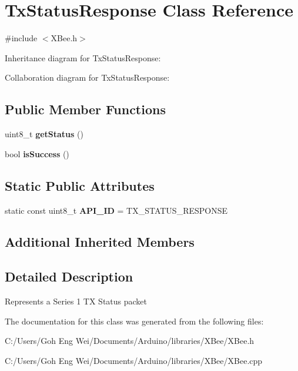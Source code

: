 \hypertarget{class_tx_status_response}{}\section{Tx\+Status\+Response Class Reference}
\label{class_tx_status_response}


{\ttfamily \#include $<$X\+Bee.\+h$>$}



Inheritance diagram for Tx\+Status\+Response\+:


Collaboration diagram for Tx\+Status\+Response\+:
\subsection*{Public Member Functions}
\begin{DoxyCompactItemize}
\item 
\hypertarget{class_tx_status_response_ac6670f7b35b65d9d032c8c4689617569}{}\label{class_tx_status_response_ac6670f7b35b65d9d032c8c4689617569} 
uint8\+\_\+t {\bfseries get\+Status} ()
\item 
\hypertarget{class_tx_status_response_ab5a35099727e48e2a3db12d844881607}{}\label{class_tx_status_response_ab5a35099727e48e2a3db12d844881607} 
bool {\bfseries is\+Success} ()
\end{DoxyCompactItemize}
\subsection*{Static Public Attributes}
\begin{DoxyCompactItemize}
\item 
\hypertarget{class_tx_status_response_a4834d215c5ff641bd2564b6f40a73088}{}\label{class_tx_status_response_a4834d215c5ff641bd2564b6f40a73088} 
static const uint8\+\_\+t {\bfseries A\+P\+I\+\_\+\+ID} = T\+X\+\_\+\+S\+T\+A\+T\+U\+S\+\_\+\+R\+E\+S\+P\+O\+N\+SE
\end{DoxyCompactItemize}
\subsection*{Additional Inherited Members}


\subsection{Detailed Description}
Represents a Series 1 TX Status packet 

The documentation for this class was generated from the following files\+:\begin{DoxyCompactItemize}
\item 
C\+:/\+Users/\+Goh Eng Wei/\+Documents/\+Arduino/libraries/\+X\+Bee/X\+Bee.\+h\item 
C\+:/\+Users/\+Goh Eng Wei/\+Documents/\+Arduino/libraries/\+X\+Bee/X\+Bee.\+cpp\end{DoxyCompactItemize}
